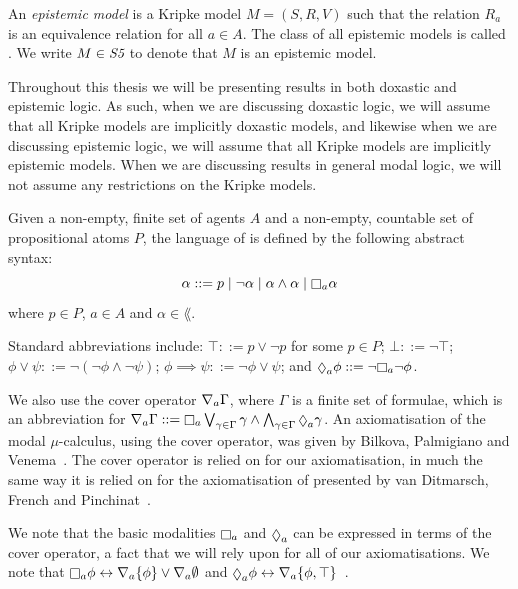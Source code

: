 \begin{definition}
An \textit{epistemic model} is a Kripke model $M = (S, R, V)$ such that the
relation $R_a$ is an equivalence relation for all $a \in A$. The class of all
epistemic models is called \classS{}. We write $M \in \textit{S5}{}$ to denote that
$M$ is an epistemic model.
\end{definition}

Throughout this thesis we will be presenting results in both doxastic and
epistemic logic.  As such, when we are discussing doxastic logic, we will
assume that all Kripke models are implicitly doxastic models, and likewise when
we are discussing epistemic logic, we will assume that all Kripke models are
implicitly epistemic models. When we are discussing results in general modal
logic, we will not assume any restrictions on the Kripke models.

\begin{definition}
Given a non-empty, finite set of agents $A$ and a non-empty, countable set of
propositional atoms $P$, the language of \lang{} is defined by the following
abstract syntax:
$$
\alpha ::=  p \bnfalt
            \neg \alpha \bnfalt
            \alpha \land \alpha \bnfalt
            \knows_a \alpha
$$
where $p \in P$, $a \in A$ and $\alpha \in \lang{}$.
\end{definition}

Standard abbreviations include:
$\top ::= p \lor \neg p$ for some $p \in P$;
$\bot ::= \neg \top$;
$\phi \lor \psi ::= \neg (\neg \phi \land \neg \psi)$;
$\phi \implies \psi ::= \neg \phi \lor \psi$;
and $\suspects_a \phi ::= \neg \knows_a \neg \phi$.

We also use the cover operator $\nabla_a \Gamma$, where $\Gamma$ is a finite
set of formulae, which is an abbreviation for $\covers_a \Gamma ::= \knows_a
\bigvee_{\gamma \in \Gamma} \gamma \land \bigwedge_{\gamma \in \Gamma}
\suspects_a \gamma$. An axiomatisation of the modal $\mu$-calculus, using the
cover operator, was given by Bilkova, Palmigiano and
Venema~\cite{bilkova2008proof}. The cover operator is relied on for our
axiomatisation, in much the same way it is relied on for the axiomatisation of
\logicKiF{} presented by van Ditmarsch, French and
Pinchinat~\cite{french2010future}.

We note that the basic modalities $\knows_a$ and $\suspects_a$ can be expressed
in terms of the cover operator, a fact that we will rely upon for all of our
axiomatisations. We note that $\knows_a \phi \iff \covers_a \{\phi\} \lor
\covers_a \emptyset$ and $\suspects_a \phi \iff \covers_a \{\phi,
\top\}$~\cite{bilkova2008proof}. 

